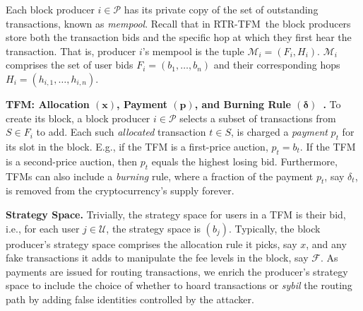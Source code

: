 \documentclass[sigconf,anonymous]{aamas}
\newcommand{\ourTFM}{\textsc{RTR-TFM}}
\renewcommand{\paragraph}[1]{\smallskip\noindent\textbf{#1}}
\begin{document}
Each block producer $i\in \mathcal{P}$ has its private copy of the set of outstanding transactions, known as \emph{mempool}. Recall that in \ourTFM\ the block producers store both the transaction bids and the specific hop at which they first hear the transaction. That is, producer $i$'s mempool is the tuple $\mathcal{M}_i=({F}_i, {H}_i)$. $\mathcal{M}_i$ comprises the set of user bids $F_i = (b_1,\ldots, b_{n})$ and their corresponding hops $H_i = (h_{i,1},\ldots, h_{i,n})$.

\paragraph{TFM: Allocation $(\mathbf{x})$, Payment $(\mathbf{p})$, and Burning Rule 
$(\mathbf{\delta})$~\cite{roughgarden2021,roughgarden2024transaction}.} To create its block, a block producer $i\in \mathcal{P}$ selects a subset of transactions from $S\in F_i$ to add. Each such \textit{allocated} transaction $t \in S$, is charged a \textit{payment} $p_t$ for its slot in the block. E.g., if the TFM is a first-price auction, $p_t = b_t$. If the TFM is a second-price auction, then $p_t$ equals the highest losing bid. Furthermore, TFMs can also include a \textit{burning} rule, where a fraction of the payment $p_t$, say $\delta_t$, is removed from the cryptocurrency's supply forever.

\paragraph{Strategy Space.} Trivially, the strategy space for users in a TFM is their bid, i.e., for each user $j\in\mathcal{U}$, the strategy space is $(b_j)$. Typically, the block producer's strategy space comprises the allocation rule it picks, say $x$, and any fake transactions it adds to manipulate the fee levels in the block, say $\mathcal{F}$. As payments are issued for routing transactions, we enrich the producer's strategy space to include the choice of whether to hoard transactions or \textit{sybil} the routing path by adding false identities controlled by the attacker.
\end{document}
